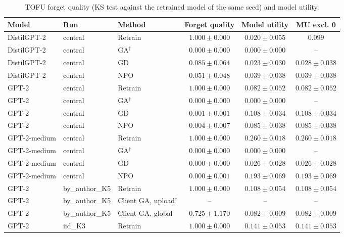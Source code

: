 \begin{table}[t]
\centering
\caption{TOFU forget quality (KS test against the retrained model of the same seed) and model utility.}
\label{tab:tofu}
\footnotesize
\renewcommand{\arraystretch}{1.2}
\setlength{\tabcolsep}{5pt}
\begin{tabular*}{\textwidth}{@{\extracolsep{\fill}}lllccc@{}}
\toprule
\textbf{Model} & \textbf{Run} & \textbf{Method} & \textbf{Forget quality} & \textbf{Model utility} & \textbf{MU excl. 0} \\
\midrule
DistilGPT-2 & central & Retrain & $1.000 \pm 0.000$ & $0.020 \pm 0.055$ & $0.099$ \\
DistilGPT-2 & central & GA$^{\dagger}$ & $0.000 \pm 0.000$ & $0.000 \pm 0.000$ & -- \\
DistilGPT-2 & central & GD & $0.085 \pm 0.064$ & $0.023 \pm 0.030$ & $0.028 \pm 0.038$ \\
DistilGPT-2 & central & NPO & $0.051 \pm 0.048$ & $0.039 \pm 0.038$ & $0.039 \pm 0.038$ \\
GPT-2 & central & Retrain & $1.000 \pm 0.000$ & $0.082 \pm 0.052$ & $0.082 \pm 0.052$ \\
GPT-2 & central & GA$^{\dagger}$ & $0.000 \pm 0.000$ & $0.000 \pm 0.000$ & -- \\
GPT-2 & central & GD & $0.001 \pm 0.001$ & $0.108 \pm 0.034$ & $0.108 \pm 0.034$ \\
GPT-2 & central & NPO & $0.004 \pm 0.007$ & $0.085 \pm 0.038$ & $0.085 \pm 0.038$ \\
GPT-2-medium & central & Retrain & $1.000 \pm 0.000$ & $0.260 \pm 0.018$ & $0.260 \pm 0.018$ \\
GPT-2-medium & central & GA$^{\dagger}$ & $0.000 \pm 0.000$ & $0.000 \pm 0.000$ & -- \\
GPT-2-medium & central & GD & $0.000 \pm 0.000$ & $0.026 \pm 0.028$ & $0.026 \pm 0.028$ \\
GPT-2-medium & central & NPO & $0.000 \pm 0.001$ & $0.193 \pm 0.069$ & $0.193 \pm 0.069$ \\
GPT-2 & by\_author\_K5 & Retrain & $1.000 \pm 0.000$ & $0.108 \pm 0.054$ & $0.108 \pm 0.054$ \\
GPT-2 & by\_author\_K5 & Client GA, upload$^{\dagger}$ & -- & -- & -- \\
GPT-2 & by\_author\_K5 & Client GA, global & $0.725 \pm 1.170$ & $0.082 \pm 0.009$ & $0.082 \pm 0.009$ \\
GPT-2 & iid\_K3 & Retrain & $1.000 \pm 0.000$ & $0.141 \pm 0.053$ & $0.141 \pm 0.053$ \\

\end{tabular*}
\end{table}
